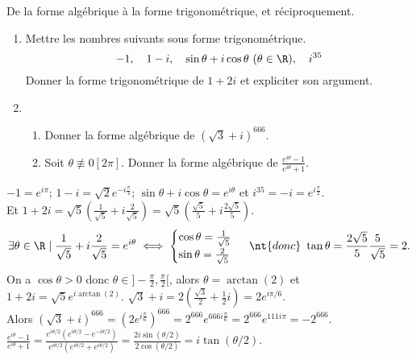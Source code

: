 \documentclass[11pt]{article}
\begin{document}
\begin{ex}{De la forme algébrique à la forme trigonométrique, et réciproquement.}{}
    \begin{enumerate}
        \item Mettre les nombres suivants sous forme trigonométrique.
        \begin{equation*}
            -1, \quad 1-i, \quad \sin\theta+i\cos\theta~(\theta\in\R),\quad i^{35}
        \end{equation*}
        Donner la forme trigonométrique de $1+2i$ et expliciter son argument.
        \item \begin{enumerate}
            \item Donner la forme algébrique de $(\sqrt{3}+i)^{666}$.
            \item Soit $\theta\not\equiv0[2\pi]$. Donner la forme algébrique de $\frac{e^{i\theta}-1}{e^{i\theta}+1}$.
        \end{enumerate}
    \end{enumerate}
    \tcblower
     $-1=e^{i\pi}$; $1-i=\sqrt{2}e^{-i\frac{\pi}{4}}$; $\sin\theta+i\cos\theta=e^{i\theta}$ et $i^{35}=-i=e^{i\frac{\pi}{2}}$.\\
    Et $1+2i=\sqrt{5}\left( \frac{1}{\sqrt{5}}+i\frac{2}{\sqrt{5}} \right) = \sqrt{5}\left( \frac{\sqrt{5}}{5}+i\frac{2\sqrt{5}}{5} \right)$.
    \begin{equation*}
        \exists\theta\in\R\mid\frac{1}{\sqrt{5}}+i\frac{2}{\sqrt{5}}=e^{i\theta} \iff \begin{cases} \cos\theta=\frac{1}{\sqrt{5}}\\ \sin\theta=\frac{2}{\sqrt{5}} \end{cases} ~\nt{donc}~\tan\theta=\frac{2\sqrt{5}}{5}\frac{5}{\sqrt{5}}=2.
    \end{equation*}
    On a $\cos\theta>0$ donc $\theta\in]-\frac{\pi}{2},\frac{\pi}{2}[$, alors $\theta=\arctan(2)$ et $1+2i=\sqrt{5}e^{i\arctan(2)}$.\n
     $\sqrt{3}+i=2\left( \frac{\sqrt{3}}{2} + \frac{1}{2}i \right)=2e^{i\pi/6}$.\\
    Alors $(\sqrt{3}+i)^{666}=(2e^{i\frac{\pi}{6}})^{666}=2^{666}e^{666i\frac{\pi}{6}}=2^{666}e^{111i\pi}=-2^{666}$.\\
     $\frac{e^{i\theta}-1}{e^{i\theta}+1}=\frac{e^{i\theta/2}(e^{i\theta/2}-e^{-i\theta/2})}{e^{i\theta/2}(e^{i\theta/2}+e^{i\theta/2})}=\frac{2i\sin(\theta/2)}{2\cos(\theta/2)}=i\tan(\theta/2)$.
\end{ex}
\end{document}
